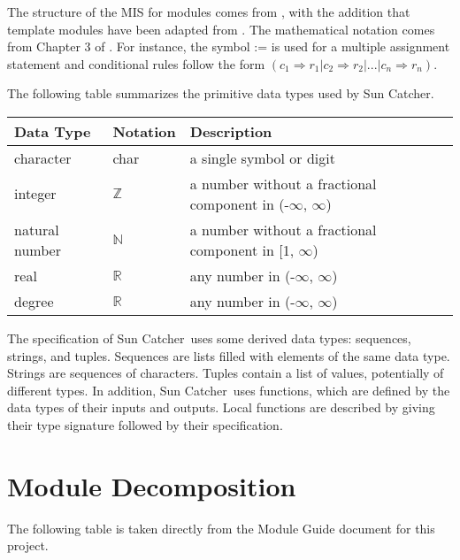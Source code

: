 \documentclass[12pt, titlepage]{article}
\newcommand{\progname}{Sun Catcher}
\begin{document}

The structure of the MIS for modules comes from \citet{HoffmanAndStrooper1995},
with the addition that template modules have been adapted from
\cite{GhezziEtAl2003}.  The mathematical notation comes from Chapter 3 of
\citet{HoffmanAndStrooper1995}.  For instance, the symbol := is used for a
multiple assignment statement and conditional rules follow the form $(c_1
\Rightarrow r_1 | c_2 \Rightarrow r_2 | ... | c_n \Rightarrow r_n )$.

The following table summarizes the primitive data types used by \progname. 

\begin{center}
\renewcommand{\arraystretch}{1.2}
\noindent 
\begin{tabular}{l l p{7.5cm}} 
\toprule 
\textbf{Data Type} & \textbf{Notation} & \textbf{Description}\\ 
\midrule
character & char & a single symbol or digit\\
integer & $\mathbb{Z}$ & a number without a fractional component in (-$\infty$,
$\infty$) \\
natural number & $\mathbb{N}$ & a number without a fractional component in [1,
$\infty$) \\
real & $\mathbb{R}$ & any number in (-$\infty$, $\infty$)\\
degree & $\mathbb{R}$ & any number in (-$\infty$, $\infty$)\\

\bottomrule
\end{tabular} 
\end{center}

\noindent
The specification of \progname \ uses some derived data types: sequences,
strings, and
tuples. Sequences are lists filled with elements of the same data type. Strings
are sequences of characters. Tuples contain a list of values, potentially of
different types. In addition, \progname \ uses functions, which
are defined by the data types of their inputs and outputs. Local functions are
described by giving their type signature followed by their specification.



\section{Module Decomposition}

The following table is taken directly from the Module Guide document for this
project.
\end{document}
